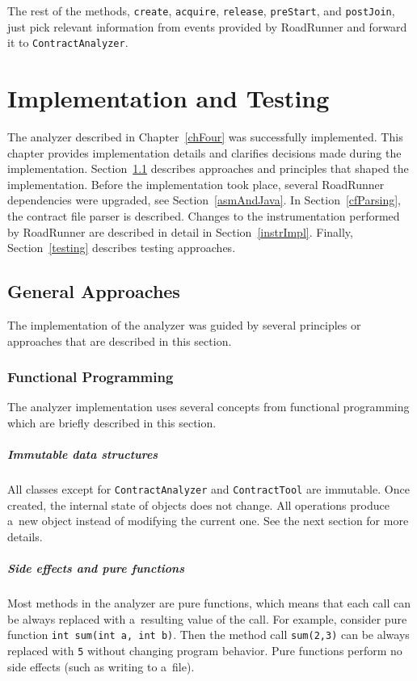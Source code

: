 The rest of the methods, \texttt{create}, \texttt{acquire}, \texttt{release},
\texttt{preStart}, and \texttt{postJoin}, just pick relevant information from
events provided by RoadRunner and forward it to \texttt{ContractAnalyzer}.



\chapter{Implementation and Testing}
\label{chFive}

The analyzer described in Chapter~\ref{chFour} was successfully implemented.
This chapter provides implementation details and clarifies decisions made during
the implementation. Section~\ref{approaches} describes approaches and principles
that shaped the implementation. Before the implementation took place, several
RoadRunner dependencies were upgraded, see Section~\ref{asmAndJava}. In
Section~\ref{cfParsing}, the contract file parser is described. Changes to the
instrumentation performed by RoadRunner are described in detail in
Section~\ref{instrImpl}. Finally, Section~\ref{testing} describes testing
approaches.

\section{General Approaches}
\label{approaches}
The implementation of the analyzer was guided by several principles or
approaches that are described in this section.

\subsection{Functional Programming}
The analyzer implementation uses several concepts from functional programming
which are briefly described in this section.

\paragraph{Immutable data structures}
All classes except for \texttt{ContractAnalyzer} and \texttt{ContractTool} are
immutable. Once created, the internal state of objects does not change. All
operations produce a~new object instead of modifying the current one. See the
next section for more details.

\paragraph{Side effects and pure functions}
Most methods in the analyzer are pure functions, which means that each call can
be always replaced with a~resulting value of the call. For example, consider
pure function \texttt{int sum(int a, int b)}. Then the method call
\texttt{sum(2,3)} can be always replaced with \texttt{5} without changing
program behavior. Pure functions perform no side effects (such as writing to
a~file).

